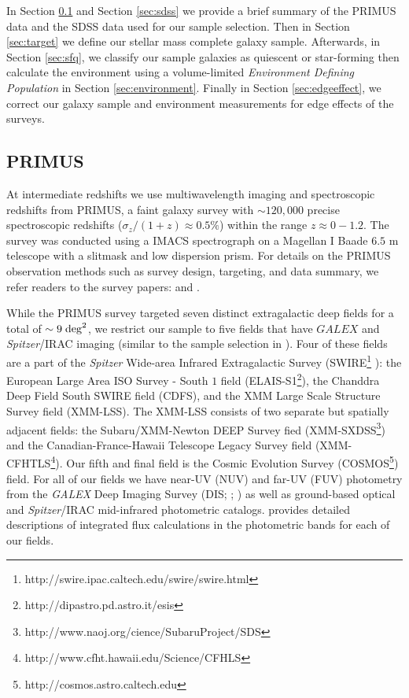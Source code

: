 \documentclass{emulateapj}
\begin{document}
In Section \ref{sec:primus} and Section \ref{sec:sdss} we provide a brief summary of the PRIMUS data and the SDSS data used for our sample selection. Then in Section \ref{sec:target} we define our stellar mass complete galaxy sample. Afterwards, in Section \ref{sec:sfq}, we classify our sample galaxies as quiescent or star-forming then calculate the environment using a volume-limited {\em Environment Defining Population} in Section \ref{sec:environment}. 
Finally in Section \ref{sec:edgeeffect}, we correct our galaxy sample and environment measurements for edge effects of the surveys. 
\subsection{PRIMUS} \label{sec:primus}
At intermediate redshifts we use multiwavelength imaging and spectroscopic redshifts from PRIMUS, a faint galaxy survey with $\sim 120,000$ precise spectroscopic redshifts ($\sigma_z/(1+z) \approx 0.5 \%$) within the range $z \approx 0-1.2$. The survey was conducted using a IMACS spectrograph on a Magellan I Baade $6.5$ m telescope with a slitmask and low dispersion prism. For details on the PRIMUS observation methods such as survey design, targeting, and data summary, we refer readers to the survey papers: \cite{Coil:2011aa} and \cite{Cool:2013aa}. 

While the PRIMUS survey targeted seven distinct extragalactic deep fields for a total of $\sim 9 \; \rm{deg}^2$, we restrict our sample to five fields that have $GALEX$ and {\em Spitzer}/IRAC imaging (similar to the sample selection in \cite{Moustakas:2013aa}). Four of these fields are a part of the {\em Spitzer} Wide-area Infrared Extragalactic Survey (SWIRE\footnote{http://swire.ipac.caltech.edu/swire/swire.html} ): the European Large Area ISO Survey - South $1$ field (ELAIS-S1\footnote{http://dipastro.pd.astro.it/esis}), the Chanddra Deep Field South SWIRE field (CDFS), and the XMM Large Scale Structure Survey field (XMM-LSS). The XMM-LSS consists of two separate but spatially adjacent fields: the Subaru/XMM-Newton DEEP Survey fied (XMM-SXDSS\footnote{http://www.naoj.org/cience/SubaruProject/SDS}) and the Canadian-France-Hawaii Telescope Legacy Survey field (XMM-CFHTLS\footnote{http://www.cfht.hawaii.edu/Science/CFHLS}). Our fifth and final field is the Cosmic Evolution Survey (COSMOS\footnote{http://cosmos.astro.caltech.edu}) field. For all of our fields we have near-UV (NUV) and far-UV (FUV) photometry from the {\em GALEX} Deep Imaging Survey (DIS; \cite{Martin:2005aa}; \cite{Morrissey:2005aa}) as well as ground-based optical and {\em Spitzer}/IRAC mid-infrared photometric catalogs. \cite{Moustakas:2013aa} provides detailed descriptions of integrated flux calculations in the photometric bands for each of our fields. 
\end{document}
